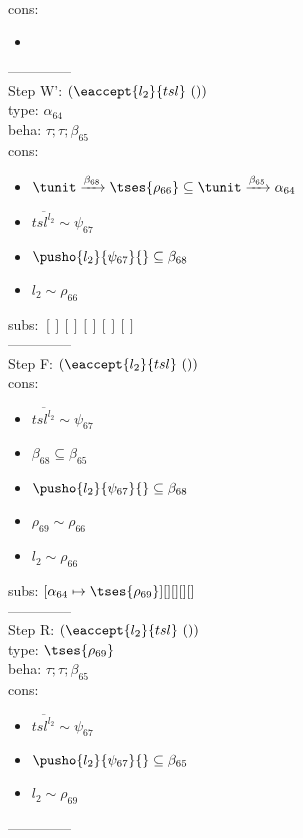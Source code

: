 \documentclass[12pt]{article}
\begin{document}
\\  cons: \begin{itemize}
\item $  $
\end{itemize} 
  --------------\\ 
Step W': $ (\eaccept{ l_{2} }{tsl}~()) $\\
  type: $ \alpha_{64} $ 
\\  beha: $ \tau; \tau; \beta_{65} $ 
\\  cons: \begin{itemize}
\item $ \tunit \xrightarrow{\beta_{68}}  \tses{ \rho_{66}} \subseteq \tunit \xrightarrow{\beta_{65}} \alpha_{64} $
\item $ \overline{{tsl}^{l_{2}}} \sim\psi_{67} $
\item $ \pusho{ l_{2}} {\psi_{67}}{} \subseteq \beta_{68} $
\item $ l_{2} \sim\rho_{66} $
\end{itemize} 
  subs:  $ [ ] [] [] [] [] $  
 \\--------------\\ 
Step F: $ (\eaccept{ l_{2} }{tsl}~()) $
 \\ cons: \begin{itemize}
\item $ \overline{{tsl}^{l_{2}}} \sim\psi_{67} $
\item $ \beta_{68} \subseteq \beta_{65} $
\item $ \pusho{ l_{2}} {\psi_{67}}{} \subseteq \beta_{68} $
\item $ \rho_{69} \sim\rho_{66} $
\item $ l_{2} \sim\rho_{66} $
\end{itemize}
 subs:  $ [ \alpha_{64}\mapsto \tses{ \rho_{69}}] [] [] [] [] $ 
  \\--------------\\ 
Step R: $ (\eaccept{ l_{2} }{tsl}~()) $\\
  type: $  \tses{ \rho_{69}} $ 
\\  beha: $ \tau; \tau; \beta_{65} $ 
\\  cons: \begin{itemize}
\item $ \overline{{tsl}^{l_{2}}} \sim\psi_{67} $
\item $ \pusho{ l_{2}} {\psi_{67}}{} \subseteq \beta_{65} $
\item $ l_{2} \sim\rho_{69} $
\end{itemize} 
  --------------\\ 
\end{document}
